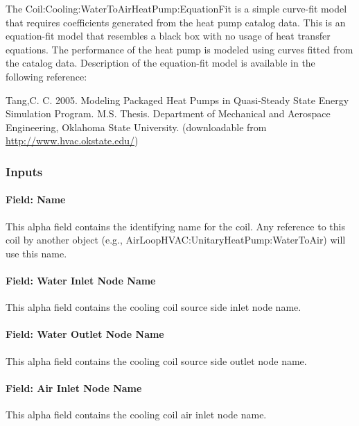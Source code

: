 The Coil:Cooling:WaterToAirHeatPump:EquationFit is a simple curve-fit model that requires coefficients generated from the heat pump catalog data. This is an equation-fit model that resembles a black box with no usage of heat transfer equations. The performance of the heat pump is modeled using curves fitted from the catalog data. Description of the equation-fit model is available in the following reference:

Tang,C. C. 2005. Modeling Packaged Heat Pumps in Quasi-Steady State Energy Simulation Program. M.S. Thesis. Department of Mechanical and Aerospace Engineering, Oklahoma State University. (downloadable from \href{http://www.hvac.okstate.edu}{http://www.hvac.okstate.edu/})

\subsubsection{Inputs}\label{inputs-30}

\paragraph{Field: Name}\label{field-name-29}

This alpha field contains the identifying name for the coil. Any reference to this coil by another object (e.g., AirLoopHVAC:UnitaryHeatPump:WaterToAir) will use this name.

\paragraph{Field: Water Inlet Node Name}\label{field-water-inlet-node-name-6-000}

This alpha field contains the cooling coil source side inlet node name.

\paragraph{Field: Water Outlet Node Name}\label{field-water-outlet-node-name-6-000}

This alpha field contains the cooling coil source side outlet node name.

\paragraph{Field: Air Inlet Node Name}\label{field-air-inlet-node-name-17}

This alpha field contains the cooling coil air inlet node name.


